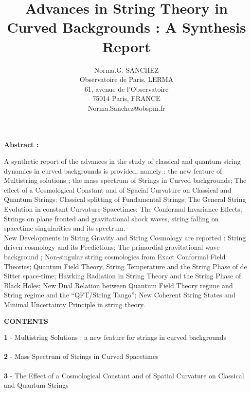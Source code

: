 \documentclass[12pt,a4paper]{article}
\begin{document}
\sloppy
\title{{\bf Advances in String Theory in \\ Curved Backgrounds : A Synthesis Report}}
\author{Norma.G. SANCHEZ \\
Observatoire de Paris, LERMA\\61, avenue de l'Observatoire\\75014 Paris, 
FRANCE\\Norma.Sanchez@obspm.fr}
\date{ }
\maketitle

\begin{center}
{\bf Abstract :} 
\end{center}
\noindent
A synthetic report of the advances in the study 
of classical and quantum string dynamics in curved backgrounds is provided, 
namely : the new feature of Multistring solutions ; the mass 
spectrum of Strings in Curved backgrounds; The effect of a Cosmological 
Constant and of Spacial Curvature on Classical and Quantum Strings; 
Classical splitting of Fundamental Strings; The General String Evolution in 
constant Curvature Spacetimes; The Conformal Invariance Effects; Strings on 
plane fronted and gravitational shock waves, string falling on spacetime 
singularities and its spectrum. \\
New Developments in String Gravity and String Cosmology are reported : String 
driven cosmology and its Predictions; The primordial gravitational wave 
background ; Non-singular string cosmologies from Exact Conformal Field 
Theories; Quantum Field Theory, String Temperature and the String Phase of 
de Sitter space-time; Hawking Radiation in String Theory and the String 
Phase of Black Holes; New Dual Relation between Quantum Field Theory regime 
and String regime and the ``QFT/String Tango''; New Coherent String States 
and Minimal Uncertainty Principle  in string theory. 
\begin{center}
{\bf CONTENTS}
\end{center}
\noindent
{\bf 1} - Multistring Solutions : a new feature for strings in curved 
backgrounds\\ \\
{\bf 2} - Mass Spectrum of Strings in Curved Spacetimes\\ \\
{\bf 3} - The Effect of a Cosmological Constant and of Spatial Curvature on  
Classical and Quantum Strings\\ \\
\end{document}
